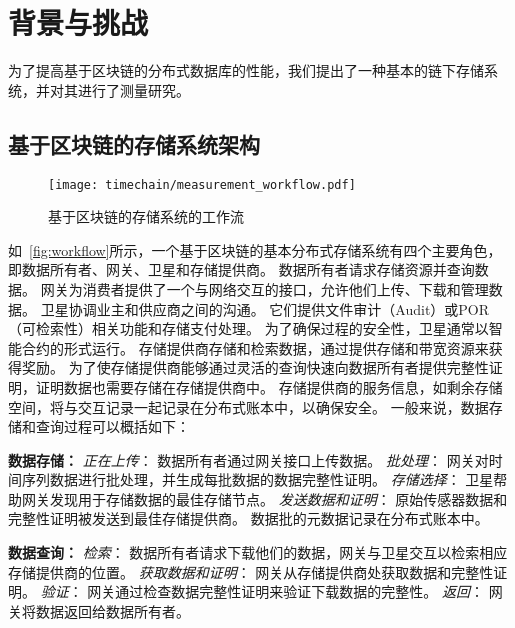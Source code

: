 \chapter{背景与挑战}
\label{sec:baseline}
为了提高基于区块链的分布式数据库的性能，我们提出了一种基本的链下存储系统，并对其进行了测量研究。

\section{基于区块链的存储系统架构}

\begin{figure}[t]
    \centering
    \texttt{[image: timechain/measurement\_workflow.pdf]}
    \caption{基于区块链的存储系统的工作流}
    \label{fig:workflow}
\end{figure}

如~\autoref{fig:workflow}所示，一个基于区块链的基本分布式存储系统有四个主要角色，即数据所有者、网关、卫星和存储提供商。
数据所有者请求存储资源并查询数据。
网关为消费者提供了一个与网络交互的接口，允许他们上传、下载和管理数据。
卫星协调业主和供应商之间的沟通。
它们提供文件审计（Audit）或POR（可检索性）相关功能和存储支付处理。
为了确保过程的安全性，卫星通常以智能合约的形式运行。
存储提供商存储和检索数据，通过提供存储和带宽资源来获得奖励。
为了使存储提供商能够通过灵活的查询快速向数据所有者提供完整性证明，证明数据也需要存储在存储提供商中。
存储提供商的服务信息，如剩余存储空间，将与交互记录一起记录在分布式账本中，以确保安全。
一般来说，数据存储和查询过程可以概括如下：

\textbf{数据存储：}
\textit{正在上传}：
数据所有者通过网关接口上传数据。
\textit{批处理}：
网关对时间序列数据进行批处理，并生成每批数据的数据完整性证明。
\textit{存储选择}：
卫星帮助网关发现用于存储数据的最佳存储节点。
\textit{发送数据和证明}：
原始传感器数据和完整性证明被发送到最佳存储提供商。
数据批的元数据记录在分布式账本中。

\textbf{数据查询：}
\textit{检索}：
数据所有者请求下载他们的数据，网关与卫星交互以检索相应存储提供商的位置。
\textit{获取数据和证明}：
网关从存储提供商处获取数据和完整性证明。
\textit{验证}：
网关通过检查数据完整性证明来验证下载数据的完整性。
\textit{返回}：
网关将数据返回给数据所有者。

